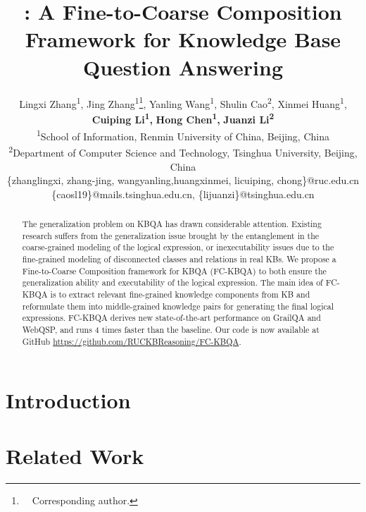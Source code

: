 \documentclass[11pt]{article}
\title{\model: A Fine-to-Coarse Composition Framework for Knowledge Base Question Answering}
\author{Lingxi Zhang\textsuperscript{1}, Jing Zhang\textsuperscript{1}\thanks{       $\text{ }$ \scriptsize Corresponding author.\normalsize}, Yanling Wang\textsuperscript{1}, Shulin Cao\textsuperscript{2}, Xinmei Huang\textsuperscript{1}, \\\textbf{Cuiping Li\textsuperscript{1},} \textbf{Hong Chen\textsuperscript{1},} \textbf{Juanzi Li\textsuperscript{2}} \\
  \textsuperscript{1}School of Information, Renmin University of China, Beijing, China\\
\textsuperscript{2}Department of Computer Science and Technology, Tsinghua University, Beijing, China\\
  \{zhanglingxi, zhang-jing, wangyanling,huangxinmei, licuiping, chong\}@ruc.edu.cn\\
  \{caosl19\}@mails.tsinghua.edu.cn,
  \{lijuanzi\}@tsinghua.edu.cn
  }
\newcommand{\model}{FC-KBQA}
\newcommand{\smodel}{FC-KBQA }
\begin{document}
\maketitle
\begin{abstract}
The generalization problem on KBQA has drawn considerable attention. Existing research suffers from the generalization issue brought by the entanglement in the coarse-grained modeling of the logical expression, or inexecutability issues due to the fine-grained modeling of disconnected classes and relations in real KBs. We propose a Fine-to-Coarse Composition framework for KBQA (\model) to both ensure the generalization ability and executability of the logical expression. The main idea of \smodel is to extract relevant fine-grained knowledge components from KB and reformulate them into middle-grained knowledge pairs for generating the final logical expressions.
\smodel derives new state-of-the-art performance on GrailQA and WebQSP, and runs 4 times faster than the baseline. 
Our code is now available at GitHub \url{https://github.com/RUCKBReasoning/FC-KBQA}.

\end{abstract}

\section{Introduction}
\label{sec:introduction}


\section{Related Work}

\end{document}
